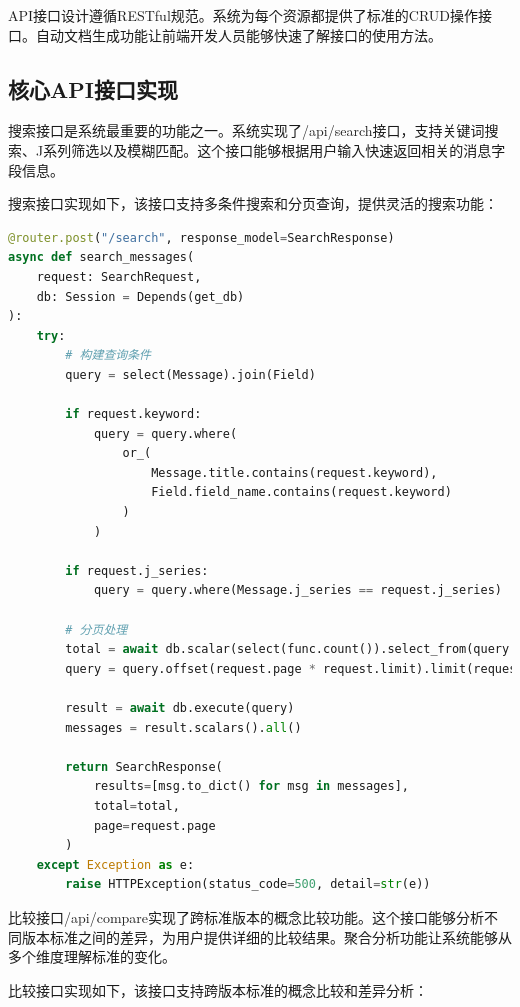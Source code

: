 API接口设计遵循RESTful规范。系统为每个资源都提供了标准的CRUD操作接口。自动文档生成功能让前端开发人员能够快速了解接口的使用方法。



\subsection{核心API接口实现}

搜索接口是系统最重要的功能之一。系统实现了/api/search接口，支持关键词搜索、J系列筛选以及模糊匹配。这个接口能够根据用户输入快速返回相关的消息字段信息。

搜索接口实现如下，该接口支持多条件搜索和分页查询，提供灵活的搜索功能：

\begin{lstlisting}[language=Python, label=fig:search_api]
@router.post("/search", response_model=SearchResponse)
async def search_messages(
    request: SearchRequest,
    db: Session = Depends(get_db)
):
    try:
        # 构建查询条件
        query = select(Message).join(Field)
        
        if request.keyword:
            query = query.where(
                or_(
                    Message.title.contains(request.keyword),
                    Field.field_name.contains(request.keyword)
                )
            )
        
        if request.j_series:
            query = query.where(Message.j_series == request.j_series)
        
        # 分页处理
        total = await db.scalar(select(func.count()).select_from(query.subquery()))
        query = query.offset(request.page * request.limit).limit(request.limit)
        
        result = await db.execute(query)
        messages = result.scalars().all()
        
        return SearchResponse(
            results=[msg.to_dict() for msg in messages],
            total=total,
            page=request.page
        )
    except Exception as e:
        raise HTTPException(status_code=500, detail=str(e))
\end{lstlisting}

比较接口/api/compare实现了跨标准版本的概念比较功能。这个接口能够分析不同版本标准之间的差异，为用户提供详细的比较结果。聚合分析功能让系统能够从多个维度理解标准的变化。

比较接口实现如下，该接口支持跨版本标准的概念比较和差异分析：

